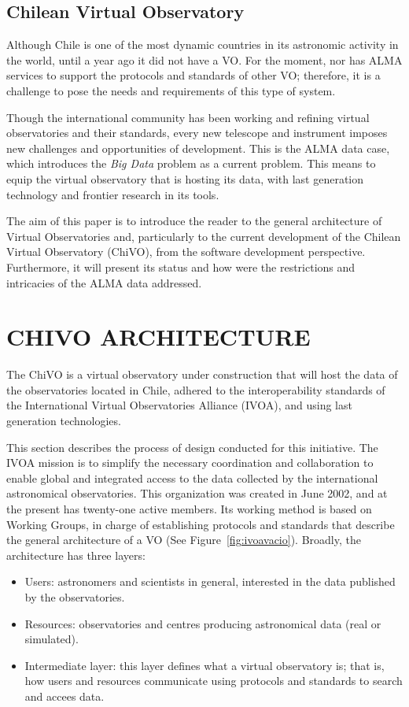 \documentclass[]{spie}
\begin{document}
\subsection{Chilean Virtual Observatory}
\label{sec:chivo}
Although Chile is one of the most dynamic countries in its astronomic activity
in the world, until a year ago it did not have a VO.  For the moment, nor has
ALMA services to support the protocols and standards of other VO; therefore, it
is a challenge to pose the needs and requirements of this type of system.

Though the international community has been working and refining virtual
observatories and their standards, every new telescope and instrument imposes
new challenges and opportunities of development.  This is the ALMA data case,
which introduces the \emph{Big Data} problem as a current problem.  This means to
equip the virtual observatory that is hosting its data, with last generation
technology and frontier research in its tools.

The aim of this paper is to introduce the reader to the general architecture of
Virtual Observatories and, particularly to the current development of the
Chilean Virtual Observatory (ChiVO), from the software development perspective.
Furthermore, it will present its status and how were the restrictions and
intricacies of the ALMA data addressed.

\section{CHIVO ARCHITECTURE} 
The ChiVO is a virtual observatory under construction that will host the data
of the observatories located in Chile, adhered to the interoperability
standards of the International Virtual Observatories Alliance (IVOA), and using
last generation technologies. 

This section describes the process of design conducted for this initiative.
The IVOA mission is to simplify the necessary coordination and collaboration to
enable global and integrated access to the data collected by the international
astronomical observatories. This organization was created in June 2002, and at
the present has twenty-one active members.  Its working method is based on
Working Groups, in charge of establishing protocols and standards that describe
the general architecture of a VO (See Figure~\ref{fig:ivoavacio}).  Broadly,
the architecture has three layers:
\begin{itemize}
    \item Users:  astronomers and scientists in general, interested in 
        the data published by the observatories.
    \item Resources: observatories and centres producing astronomical 
        data (real or simulated).
    \item Intermediate layer:  this layer defines what a virtual observatory 
        is; that is, how users and resources communicate using protocols and 
        standards to search and accees data.
\end{itemize}
\end{document}
